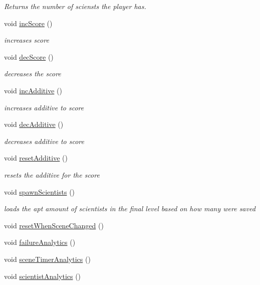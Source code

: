 \begin{DoxyCompactItemize}
\begin{DoxyCompactList}\small\item\em Returns the number of sciensts the player has. \end{DoxyCompactList}\item 
void \hyperlink{class_global_controller_afe90e502d26e3585ef975555464bc323}{inc\+Score} ()
\begin{DoxyCompactList}\small\item\em increases score \end{DoxyCompactList}\item 
void \hyperlink{class_global_controller_a3c6c2fe54c92b170a0f0cc41c7230a09}{dec\+Score} ()
\begin{DoxyCompactList}\small\item\em decreases the score \end{DoxyCompactList}\item 
void \hyperlink{class_global_controller_afe1a424022cd73ea41fd2385db6a6189}{inc\+Additive} ()
\begin{DoxyCompactList}\small\item\em increases additive to score \end{DoxyCompactList}\item 
void \hyperlink{class_global_controller_aca3ee9a56dbfaeaf1af53422d6afea44}{dec\+Additive} ()
\begin{DoxyCompactList}\small\item\em decreases additive to score \end{DoxyCompactList}\item 
void \hyperlink{class_global_controller_a5a65bdfd453a4b0f3a609d02872a2f73}{reset\+Additive} ()
\begin{DoxyCompactList}\small\item\em resets the additive for the score \end{DoxyCompactList}\item 
void \hyperlink{class_global_controller_a557ce172d6b9580858646f53c354cfcb}{spawn\+Scientists} ()
\begin{DoxyCompactList}\small\item\em loads the apt amount of scientists in the final level based on how many were saved \end{DoxyCompactList}\item 
void \hyperlink{class_global_controller_a8327a637a3ce3e3766e46e449f9218ff}{reset\+When\+Scene\+Changed} ()
\item 
void \hyperlink{class_global_controller_a6a9521c88ce33872ebc420e4d8bd5e48}{failure\+Analytics} ()
\item 
void \hyperlink{class_global_controller_a001ba1f6e0dab8a0e30efb94b10e926c}{scene\+Timer\+Analytics} ()
\item 
void \hyperlink{class_global_controller_a57909fe4f0acecd6591ea7eb119b5512}{scientist\+Analytics} ()
\end{DoxyCompactItemize}
